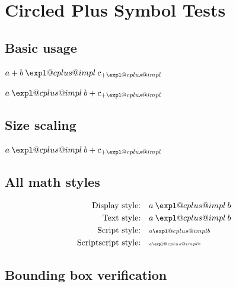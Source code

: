 \documentclass{article}
\makeatletter
\def\expl@cplus@thickness{0.06}     %
\def\expl@cplus@circlesize{0.5}     %
\newcommand{\explcplus}{%
  \mathbin{\mathpalette\expl@cplus@impl\relax}%
}
\newcommand{\expl@cplus@impl}[2]{%
  \vcenter{\hbox{%
    \expl@cplus@measure{#1}%
    \expl@cplus@draw
  }}%
}
\newcommand{\expl@cplus@measure}[1]{%
  \sbox\z@{$\m@th#1+$}%
  \expl@cplus@totalheight=\dimexpr\ht\z@ + \dp\z@\relax
  \expl@cplus@symbolwidth=\wd\z@
}
\newcommand{\expl@cplus@draw}{%
  \linethickness{\expl@cplus@thickness\expl@cplus@totalheight}%
  \unitlength=\expl@cplus@totalheight
  \begin{picture}(\expl@cplus@symbolwidth,1)
    \put(0.5\expl@cplus@symbolwidth, 0.5){%
      \circle{\expl@cplus@circlesize}%
    }%
    \put(0.5\expl@cplus@symbolwidth, 0){%
      \line(0,1){1}%
    }%
    \put(0, 0.5){%
      \line(1,0){\expl@cplus@symbolwidth}%
    }%
  \end{picture}%
}
\makeatother
\begin{document}
\section*{Circled Plus Symbol Tests}

\subsection*{Basic usage}
$a + b \explcplus c_{+\explcplus}$

$a \explcplus b + c_{+\explcplus}$

\subsection*{Size scaling}
{\LARGE $a \explcplus b + c_{+\explcplus}$}

\subsection*{All math styles}
\begin{align*}
  \text{Display style:}      &\quad a \explcplus b \\
  \text{Text style:}         &\quad \textstyle a \explcplus b \\
  \text{Script style:}       &\quad \scriptstyle a \explcplus b \\
  \text{Scriptscript style:} &\quad \scriptscriptstyle a \explcplus b
\end{align*}

\subsection*{Bounding box verification}
\setlength{\fboxsep}{-0.1pt}%
\setlength{\fboxrule}{0.1pt}%
\fbox{$+$}\fbox{$\explcplus$}
\par\nointerlineskip
\fbox{$\explcplus$}\fbox{$+$}
\end{document}
